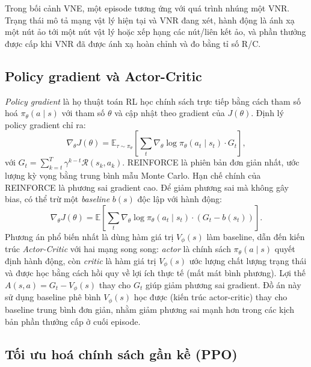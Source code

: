 \documentclass[../DoAn.tex]{subfiles}
\begin{document}
Trong bối cảnh VNE, một episode tương ứng với quá trình nhúng một VNR. Trạng thái mô tả mạng vật lý hiện tại và VNR đang xét, hành động là ánh xạ một nút ảo tới một nút vật lý hoặc xếp hạng các nút/liên kết ảo, và phần thưởng được cấp khi VNR đã được ánh xạ hoàn chỉnh và đo bằng tỉ số R/C.

\subsection{Policy gradient và Actor-Critic}

\textit{Policy gradient} là họ thuật toán RL học chính sách trực tiếp bằng cách tham số hoá $\pi_\theta(a \mid s)$ với tham số $\theta$ và cập nhật theo gradient của $J(\theta)$. Định lý policy gradient\cite{sutton2018rl} chỉ ra:
\begin{equation}
    \nabla_\theta J(\theta) = \mathbb{E}_{\tau \sim \pi_\theta}\left[ \sum_t \nabla_\theta \log \pi_\theta(a_t \mid s_t) \cdot G_t \right],
\end{equation}
với $G_t = \sum_{k=t}^{T} \gamma^{k-t} \mathcal{R}(s_k, a_k)$. REINFORCE\cite{williams1992reinforce} là phiên bản đơn giản nhất, ước lượng kỳ vọng bằng trung bình mẫu Monte Carlo. Hạn chế chính của REINFORCE là phương sai gradient cao. Để giảm phương sai mà không gây bias, có thể trừ một \textit{baseline} $b(s)$ độc lập với hành động:
\begin{equation}
    \nabla_\theta J(\theta) = \mathbb{E}\left[ \sum_t \nabla_\theta \log \pi_\theta(a_t \mid s_t) \cdot (G_t - b(s_t)) \right].
\end{equation}
Phương án phổ biến nhất là dùng hàm giá trị $V_\phi(s)$ làm baseline, dẫn đến kiến trúc \textit{Actor-Critic} với hai mạng song song: \textit{actor} là chính sách $\pi_\theta(a\mid s)$ quyết định hành động, còn \textit{critic} là hàm giá trị $V_\phi(s)$ ước lượng chất lượng trạng thái và được học bằng cách hồi quy về lợi ích thực tế (mất mát bình phương). Lợi thế $A(s,a)=G_t - V_\phi(s)$ thay cho $G_t$ giúp giảm phương sai gradient. Đồ án này sử dụng baseline phê bình $V_\phi(s)$ học được (kiến trúc actor-critic) thay cho baseline trung bình đơn giản, nhằm giảm phương sai mạnh hơn trong các kịch bản phần thưởng cấp ở cuối episode.

\subsection{Tối ưu hoá chính sách gần kề (PPO)}
\end{document}
